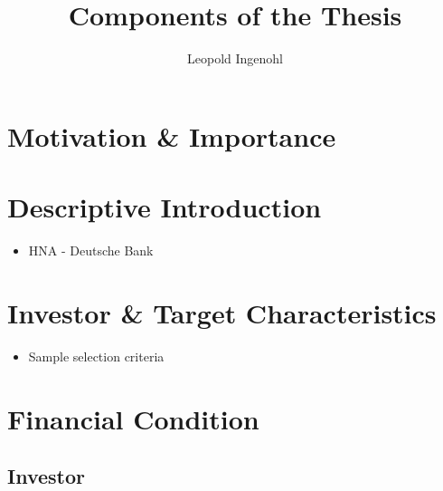 \documentclass[12pt]{article}
\title{Components of the Thesis}
\author{Leopold Ingenohl}
\begin{document}
\maketitle


\section{Motivation \& Importance} 

\section{Descriptive Introduction}
    \begin{itemize}
        \item HNA - Deutsche Bank
    \end{itemize}

\section{Investor \& Target Characteristics}

    \begin{itemize}
    \item Sample selection criteria
    \end{itemize}

\section{Financial Condition}

    \subsection{Investor}
\end{document}
